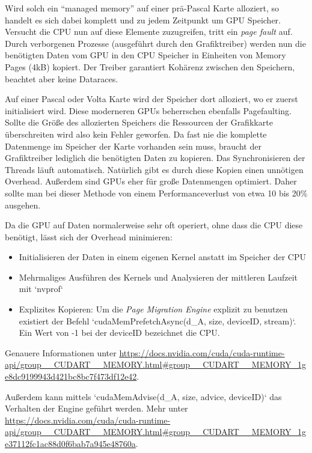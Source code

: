 		\bigskip
		
		Wird solch ein \enquote{managed memory} auf einer prä-Pascal Karte alloziert, so handelt es sich dabei komplett und zu jedem Zeitpunkt um GPU Speicher. Versucht die CPU nun auf diese Elemente zuzugreifen, tritt ein \textit{page fault} auf. Durch verborgenen Prozesse (ausgeführt durch den Grafiktreiber) werden nun die benötigten Daten vom GPU in den CPU Speicher in Einheiten von Memory Pages (4kB) kopiert. Der Treiber garantiert Kohärenz zwischen den Speichern, beachtet aber keine Dataraces.
		
		Auf einer Pascal oder Volta Karte wird der Speicher dort alloziert, wo er zuerst initialisiert wird. Diese moderneren GPUs beherrschen ebenfalls Pagefaulting. Sollte die Größe des allozierten Speichers die Ressourcen der Grafikkarte überschreiten wird also kein Fehler geworfen. Da fast nie die komplette Datenmenge im Speicher der Karte vorhanden sein muss, braucht der Grafiktreiber lediglich die benötigten Daten zu kopieren. Das Synchronisieren der \Glspl{Thread} läuft automatisch. Natürlich gibt es durch diese Kopien einen unnötigen Overhead. Außerdem sind GPUs eher für große Datenmengen optimiert. Daher sollte man bei dieser Methode von einem Performanceverlust von etwa 10 bis 20\% ausgehen. 
		
		Da die GPU auf Daten normalerweise sehr oft operiert, ohne dass die CPU diese benötigt, lässt sich der Overhead minimieren:
		\begin{itemize}
		\item Initialisieren der Daten in einem eigenen \Gls{Kernel} anstatt im Speicher der CPU
		\item Mehrmaliges Ausführen des \Gls{Kernel}s und Analysieren der mittleren Laufzeit mit \li`nvprof`
		\item Explizites Kopieren: Um die \textit{Page Migration Engine} explizit zu benutzen existiert der Befehl \li`cudaMemPrefetchAsync(d_A, size, deviceID, stream)`. Ein Wert von -1 bei der deviceID bezeichnet die CPU.
		\end{itemize}
		Genauere Informationen unter \url{https://docs.nvidia.com/cuda/cuda-runtime-api/group__CUDART__MEMORY.html#group__CUDART__MEMORY_1ge8dc9199943d421bc8bc7f473df12e42}.
		
		Außerdem kann mittels \li`cudaMemAdvise(d_A, size, advice, deviceID)` das Verhalten der Engine geführt werden. Mehr unter \url{https://docs.nvidia.com/cuda/cuda-runtime-api/group__CUDART__MEMORY.html#group__CUDART__MEMORY_1ge37112fc1ac88d0f6bab7a945e48760a}.

